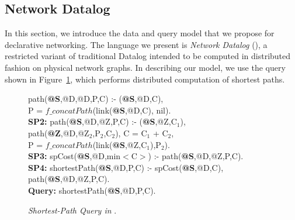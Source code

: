 

\subsection{Network Datalog}

In this section, we introduce the data and query model that we propose
for declarative networking. The language we present is {\em Network
  Datalog} (\Dlog), a restricted variant of traditional Datalog intended
to be computed in distributed fashion on physical network graphs.  In
describing our model, we use the \Dlog query shown in
Figure~\ref{shortestPath}, which performs distributed computation of
shortest paths.


\begin{figure}[ht]
\begin{boxedminipage}{3.2in}
{\small
{} path({\bf @S},@D,@D,P,C) :- \link({\bf @S},@D,C), \\
\datalogspace P = $f\_concatPath$(link({\bf @S},@D,C), nil). \\
{\bf SP2: } path({\bf @S},@D,@Z,P,C) :-
  \link({\bf @S},@Z,C$_{1}$), \\
\datalogspace path({\bf @Z},@D,@Z$_{2}$,P$_{2}$,C$_{2}$), C = C$_{1}$ +
C$_{2}$, \\
\datalogspace P = $f\_concatPath$(link({\bf @S},@Z,C$_{1}$),P$_{2}$).\\ 
{\bf SP3: } spCost({\bf @S},@D,min$<$C$>$) :- path({\bf @S},@D,@Z,P,C).\\
{\bf SP4: } shortestPath({\bf @S},@D,P,C) :-
spCost({\bf @S},@D,C),\\
\datalogspace path({\bf @S},@D,@Z,P,C).\\
{\bf Query: } shortestPath({\bf @S},@D,P,C).
}
\end{boxedminipage}
\small{\caption{\label{shortestPath}\emph{\small Shortest-Path
      Query in \Dlog}.}}
\end{figure}

